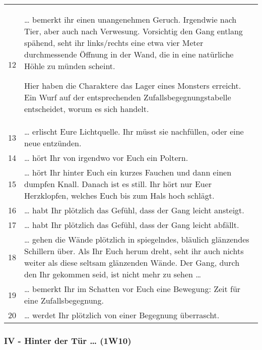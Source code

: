 \documentclass[11pt]{wbzine}
\begin{document}
\begin{tabularx}{\columnwidth}{cZ}
12 & 
  \ldots{} bemerkt ihr einen unangenehmen Geruch. Irgendwie nach Tier,
  aber auch nach Verwesung. Vorsichtig den Gang entlang spähend, seht
  ihr links/rechts eine etwa vier Meter durchmessende Öffnung in der
  Wand, die in eine natürliche Höhle zu münden scheint.

  Hier haben die Charaktere das Lager eines Monsters erreicht. Ein Wurf
  auf der entsprechenden Zufallsbegegnungstabelle entscheidet, worum es
  sich handelt.
\\
13 & 
  \ldots{} erlischt Eure Lichtquelle. Ihr müsst sie nachfüllen, oder
  eine neue entzünden.
\\
14 & 
  \ldots{} hört Ihr von irgendwo vor Euch ein Poltern.
\\
15 & 
  \ldots{} hört Ihr hinter Euch ein kurzes Fauchen und dann einen
  dumpfen Knall. Danach ist es still. Ihr hört nur Euer Herzklopfen,
  welches Euch bis zum Hals hoch schlägt.
\\
16 & 
  \ldots{} habt Ihr plötzlich das Gefühl, dass der Gang leicht ansteigt.
\\
17 & 
  \ldots{} habt Ihr plötzlich das Gefühl, dass der Gang leicht abfällt.
\\
18 & 
  \ldots{} gehen die Wände plötzlich in spiegelndes, bläulich glänzendes
  Schillern über. Als Ihr Euch herum dreht, seht ihr auch nichts weiter
  als diese seltsam glänzenden Wände. Der Gang, durch den Ihr gekommen
  seid, ist nicht mehr zu sehen \ldots{}
\\
19 & 
  \ldots{} bemerkt Ihr im Schatten vor Euch eine Bewegung: Zeit für eine
  Zufallsbegegnung.
\\
20 & \ldots{} werdet Ihr plötzlich von einer Begegnung überrascht.
\end{tabularx}

\subsubsection{IV - Hinter der Tür \ldots{} (1W10)}
\end{document}
